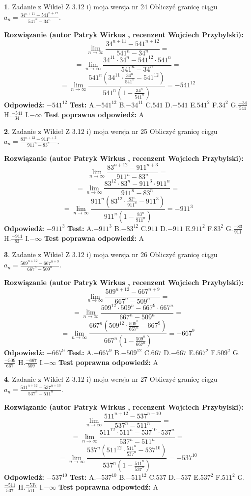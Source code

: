 \documentclass[12pt, a4paper]{article}
\theoremstyle{definition} %
\newtheorem{zad}{}
\newcommand{\zadStart}[1]{\begin{zad}#1\newline}
\newcommand{\zadStop}{\end{zad}}
\newcommand{\rozwStart}[2]{\noindent \textbf{Rozwiązanie (autor #1 , recenzent #2): }\newline}
\newcommand{\rozwStop}{\newline}
\newcommand{\odpStart}{\noindent \textbf{Odpowiedź:}\newline}
\newcommand{\odpStop}{\newline}
\newcommand{\testStart}{\noindent \textbf{Test:}\newline}
\newcommand{\testStop}{\newline}
\newcommand{\kluczStart}{\noindent \textbf{Test poprawna odpowiedź:}\newline}
\newcommand{\kluczStop}{\newline}
\begin{document}
\zadStart{Zadanie z Wikieł Z 3.12 i) moja wersja nr 24}
Obliczyć granicę ciągu $a_{n}=\frac{34^{n+11} - 541^{n+12}}{541^{n}-34^{n}}$.
\zadStop
\rozwStart{Patryk Wirkus}{Wojciech Przybylski}
$$\lim\limits_{n\to\infty}\frac{34^{n+11} - 541^{n+12}}{541^{n}-34^{n}}=$$
$$= \lim\limits_{n\to\infty}\frac{34^{11} \cdot 34^{n} - 541^{12} \cdot 541^{n}}{541^{n}-34^{n}}=$$
$$= \lim\limits_{n\to\infty}\frac{541^{n}(34^{11} \cdot \frac{34^{n}}{541^{n}} - 541^{12})}{541^{n}(1-\frac{34^{n}}{541^{n}})} = -541^{12}$$
\rozwStop
\odpStart
$-541^{12}$
\odpStop
\testStart
A.$-541^{12}$
B.$-34^{11}$
C.$541$
D.$-541$
E.$541^{2}$
F.$34^{2}$
G.$\frac{-34}{541}$
H.$\frac{-541}{34}$
I.$-\infty$
\testStop
\kluczStart
A
\kluczStop



\zadStart{Zadanie z Wikieł Z 3.12 i) moja wersja nr 25}
Obliczyć granicę ciągu $a_{n}=\frac{83^{n+12} - 911^{n+3}}{911^{n}-83^{n}}$.
\zadStop
\rozwStart{Patryk Wirkus}{Wojciech Przybylski}
$$\lim\limits_{n\to\infty}\frac{83^{n+12} - 911^{n+3}}{911^{n}-83^{n}}=$$
$$= \lim\limits_{n\to\infty}\frac{83^{12} \cdot 83^{n} - 911^{3} \cdot 911^{n}}{911^{n}-83^{n}}=$$
$$= \lim\limits_{n\to\infty}\frac{911^{n}(83^{12} \cdot \frac{83^{n}}{911^{n}} - 911^{3})}{911^{n}(1-\frac{83^{n}}{911^{n}})} = -911^{3}$$
\rozwStop
\odpStart
$-911^{3}$
\odpStop
\testStart
A.$-911^{3}$
B.$-83^{12}$
C.$911$
D.$-911$
E.$911^{2}$
F.$83^{2}$
G.$\frac{-83}{911}$
H.$\frac{-911}{83}$
I.$-\infty$
\testStop
\kluczStart
A
\kluczStop



\zadStart{Zadanie z Wikieł Z 3.12 i) moja wersja nr 26}
Obliczyć granicę ciągu $a_{n}=\frac{509^{n+12} - 667^{n+9}}{667^{n}-509^{n}}$.
\zadStop
\rozwStart{Patryk Wirkus}{Wojciech Przybylski}
$$\lim\limits_{n\to\infty}\frac{509^{n+12} - 667^{n+9}}{667^{n}-509^{n}}=$$
$$= \lim\limits_{n\to\infty}\frac{509^{12} \cdot 509^{n} - 667^{9} \cdot 667^{n}}{667^{n}-509^{n}}=$$
$$= \lim\limits_{n\to\infty}\frac{667^{n}(509^{12} \cdot \frac{509^{n}}{667^{n}} - 667^{9})}{667^{n}(1-\frac{509^{n}}{667^{n}})} = -667^{9}$$
\rozwStop
\odpStart
$-667^{9}$
\odpStop
\testStart
A.$-667^{9}$
B.$-509^{12}$
C.$667$
D.$-667$
E.$667^{2}$
F.$509^{2}$
G.$\frac{-509}{667}$
H.$\frac{-667}{509}$
I.$-\infty$
\testStop
\kluczStart
A
\kluczStop



\zadStart{Zadanie z Wikieł Z 3.12 i) moja wersja nr 27}
Obliczyć granicę ciągu $a_{n}=\frac{511^{n+12} - 537^{n+10}}{537^{n}-511^{n}}$.
\zadStop
\rozwStart{Patryk Wirkus}{Wojciech Przybylski}
$$\lim\limits_{n\to\infty}\frac{511^{n+12} - 537^{n+10}}{537^{n}-511^{n}}=$$
$$= \lim\limits_{n\to\infty}\frac{511^{12} \cdot 511^{n} - 537^{10} \cdot 537^{n}}{537^{n}-511^{n}}=$$
$$= \lim\limits_{n\to\infty}\frac{537^{n}(511^{12} \cdot \frac{511^{n}}{537^{n}} - 537^{10})}{537^{n}(1-\frac{511^{n}}{537^{n}})} = -537^{10}$$
\rozwStop
\odpStart
$-537^{10}$
\odpStop
\testStart
A.$-537^{10}$
B.$-511^{12}$
C.$537$
D.$-537$
E.$537^{2}$
F.$511^{2}$
G.$\frac{-511}{537}$
H.$\frac{-537}{511}$
I.$-\infty$
\testStop
\kluczStart
A
\kluczStop
\end{document}
